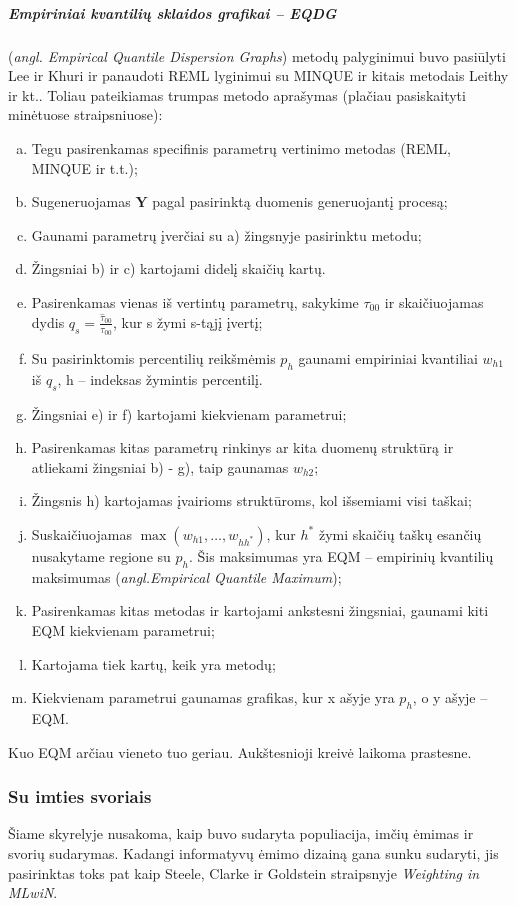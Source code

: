 \documentclass[11pt,a4paper]{article}
\begin{document}
\subparagraph{Empiriniai kvantilių sklaidos grafikai -- EQDG}(\textit{angl. Empirical Quantile Dispersion Graphs}) metodų palyginimui buvo pasiūlyti Lee ir Khuri\cite{eqdg1} ir panaudoti REML lyginimui su MINQUE ir kitais metodais Leithy ir kt.\cite{MMINQUE}. Toliau pateikiamas trumpas metodo aprašymas (plačiau pasiskaityti minėtuose straipsniuose):
\begin{enumerate}[a)] 
\item Tegu pasirenkamas specifinis parametrų vertinimo metodas (REML, MINQUE ir t.t.);
\item Sugeneruojamas $\mathbf{Y}$ pagal pasirinktą duomenis generuojantį procesą;
\item Gaunami parametrų įverčiai su a) žingsnyje pasirinktu metodu;
\item Žingsniai b) ir c) kartojami didelį skaičių kartų.
\item Pasirenkamas vienas iš vertintų parametrų, sakykime $\tau_{00}$ ir skaičiuojamas dydis $q_s=\frac{\hat{\tau}_{00}}{\tau_{00}}$, kur s žymi s-tąjį įvertį;
\item Su pasirinktomis percentilių reikšmėmis $p_h$ gaunami empiriniai kvantiliai $w_{h1}$ iš $q_s$, h -- indeksas žymintis percentilį.
\item Žingsniai e) ir f) kartojami kiekvienam parametrui;
\item Pasirenkamas kitas parametrų rinkinys ar kita duomenų struktūrą ir atliekami žingsniai b) - g), taip gaunamas $w_{h2}$;
\item Žingsnis h) kartojamas įvairioms struktūroms, kol išsemiami visi taškai;
\item Suskaičiuojamas $\max (w_{h1},\dots,w_{hh^*})$, kur $h^*$ žymi skaičių taškų esančių nusakytame regione su $p_h$. Šis maksimumas yra EQM -- empirinių kvantilių maksimumas (\textit{angl.Empirical Quantile Maximum});
\item Pasirenkamas kitas metodas ir kartojami ankstesni žingsniai, gaunami kiti EQM kiekvienam parametrui;
\item Kartojama tiek kartų, keik yra metodų;
\item Kiekvienam parametrui gaunamas grafikas, kur x ašyje yra $p_h$, o y ašyje -- EQM.
\end{enumerate}
\indent Kuo EQM arčiau vieneto tuo geriau. Aukštesnioji kreivė laikoma prastesne.

\subsubsection{Su imties svoriais}\label{subsubsec:susvoriais}
\indent Šiame skyrelyje nusakoma, kaip buvo sudaryta populiacija, imčių ėmimas ir svorių sudarymas. Kadangi informatyvų ėmimo dizainą gana sunku sudaryti, jis pasirinktas toks pat kaip Steele, Clarke ir Goldstein straipsnyje \textit{Weighting in MLwiN}\cite{mlwin}. 
\end{document}
